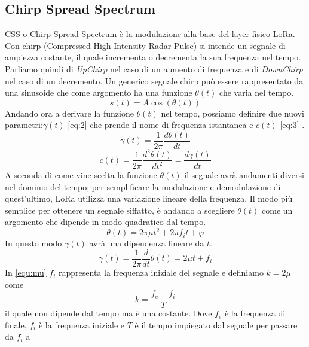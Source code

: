 \subsection{Chirp Spread Spectrum}
CSS o Chirp Spread Spectrum è la modulazione alla base del layer fisico LoRa. 
Con chirp (Compressed High Intensity Radar Pulse) si intende un segnale di
ampiezza costante, il quale incrementa o decrementa la sua frequenza nel tempo.
Parliamo quindi di \emph{UpChirp} nel caso di un aumento di frequenza e di
\emph{DownChirp} nel caso di un decremento.
Un generico segnale chirp può essere rappresentato da una sinusoide che come
argomento ha una funzione $\theta(t)$ che varia nel tempo.
\begin{equation}\label{eq:1}
        s(t) = A\cos(\theta (t))
\end{equation}
Andando ora a derivare la funzione  $\theta(t)$ nel tempo, possiamo  definire due
nuovi parametri:$\gamma(t)$ \ref{eq:2} che prende il nome di frequenza
istantanea e  $c(t)$ \ref{eq:3} .
\begin{equation}\label{eq:2}
        \gamma(t) = \frac{1}{2\pi} \frac{d\theta(t)}{dt}
\end{equation}
\begin{equation}\label{eq:3}
        c(t) = \frac{1}{2\pi}\frac{d^2\theta(t)}{dt^2} = \frac{d\gamma(t)}{dt}
\end{equation}
A seconda di come vine scelta la funzione $\theta(t)$ il segnale avrà
andamenti diversi nel dominio del tempo; per semplificare la modulazione e
demodulazione di quest'ultimo, LoRa utilizza una variazione lineare della frequenza.
Il modo più semplice per ottenere un segnale siffatto, è andando a scegliere $\theta(t)$
come un argomento che dipende in modo quadratico dal tempo.
\begin{equation}
        \theta(t) = 2\pi\mu t^2+2\pi f_it+\varphi
\end{equation}
In questo modo $\gamma(t)$ avrà una dipendenza lineare da $t$.
\begin{equation}\label{equ:mu}
        \gamma(t) = \frac{1}{2\pi}\frac{d}{dt}\theta(t)  = 2\mu t+ f_i
\end{equation}
In \ref{equ:mu} $f_i$ rappresenta la frequenza iniziale del segnale e definiamo
$k = 2\mu$ come 
\begin{equation}\label{equ:chirpizzazione}
        k =  \frac{f_e-f_i}{T}
\end{equation}
il quale non dipende dal tempo ma è una costante.  Dove $f_e$ è la frequenza di finale, $f_i$ è la
frequenza iniziale e $T$ è il tempo impiegato dal segnale per passare da $f_i$ a

